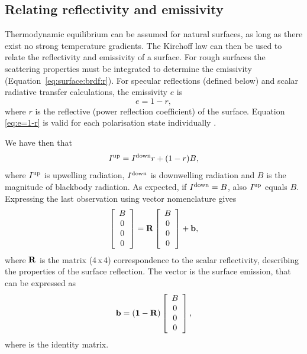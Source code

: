 \subsection{Relating reflectivity and emissivity}
 Thermodynamic equilibrium can be assumed for natural surfaces, as
 long as there exist no strong temperature gradients. The Kirchoff law
 can then be used to relate the reflectivity and emissivity of a
 surface. For rough surfaces the scattering properties must be
 integrated to determine the
 emissivity (Equation~\ref{eq:surface:brdf:r}). For specular
 reflections (defined below) and scalar radiative transfer
 calculations, the emissivity $e$ is
 \begin{equation}
  \label{eq:e=1-r}
   e = 1 - r,
 \end{equation}
 where $r$ is the reflective (power reflection coefficient) of the
 surface.  Equation \ref{eq:e=1-r} is valid for each polarisation state
 individually \citep[Eq.\ 4.190a]{ulaby:81}.

 We have then that
 \begin{equation}
  I^\mathrm{up} = I^\mathrm{down}r + (1-r)B,
 \end{equation}
 where $I^\mathrm{up}$ is upwelling radiation, $I^\mathrm{down}$
 is downwelling radiation and $B$ is the magnitude of blackbody
 radiation. As expected, if $I^\mathrm{down}=B$, also
 $I^\mathrm{up}$ equals $B$.  Expressing the last observation using
 vector nomenclature gives
 \begin{equation}
   \left[\begin{array}{c} B \\ 0 \\0\\0 \end{array}\right] =
  \mathbf{R} \left[\begin{array}{c} B \\ 0 \\0\\0 \end{array}\right] + 
  \mathbf{b},
 \end{equation}
 where $\mathbf{R}$ is the matrix (4\,x\,4) correspondence to the
 scalar reflectivity, describing the properties of the surface
 reflection. The vector  is the surface emission, that
 can be expressed as
 \begin{equation}
  \label{eq:surface:bvector} 
  \mathbf{b} = (\mathbf{1}-\mathbf{R})
      \left[\begin{array}{c} B \\ 0 \\0\\0 \end{array}\right],
 \end{equation}
 where  is the identity matrix. 



